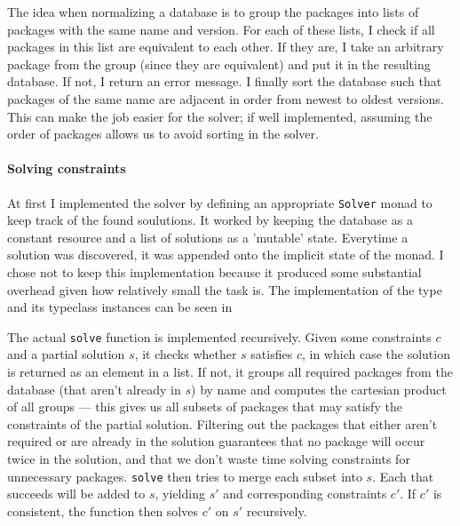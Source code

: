 The idea when normalizing a database is to group the packages into lists of packages with the same name and version. For each of these lists, I check if all packages in this list are equivalent to each other. If they are, I take an arbitrary package from the group (since they are equivalent) and put it in the resulting database. If not, I return an error message. I finally sort the database such that packages of the same name are adjacent in order from newest to oldest versions. This can make the job easier for the solver; if well implemented, assuming the order of packages allows us to avoid sorting in the solver.

\paragraph{Solving constraints}
At first I implemented the solver by defining an appropriate \texttt{Solver} monad to keep track of the found soulutions. It worked by keeping the database as a constant resource and a list of solutions as a 'mutable' state. Everytime a solution was discovered, it was appended onto the implicit state of the monad. I chose not to keep this implementation because it produced some substantial overhead given how relatively small the task is. The implementation of the type and its typeclass instances can be seen in
%
%
%
%
%

The actual \texttt{solve} function is implemented recursively. Given some constraints $c$ and a partial solution $s$, it checks whether $s$ satisfies $c$, in which case the solution is returned as an element in a list. If not, it groups all required packages from the database (that aren't already in $s$) by name and computes the cartesian product of all groups --- this gives us all subsets of packages that may satisfy the constraints of the partial solution. Filtering out the packages that either aren't required or are already in the solution guarantees that no package will occur twice in the solution, and that we don't waste time solving constraints for unnecessary packages. \texttt{solve} then tries to merge each subset into $s$. Each that succeeds will be added to $s$, yielding $s'$ and corresponding constraints $c'$. If $c'$ is consistent, the function then solves $c'$ on $s'$ recursively.

